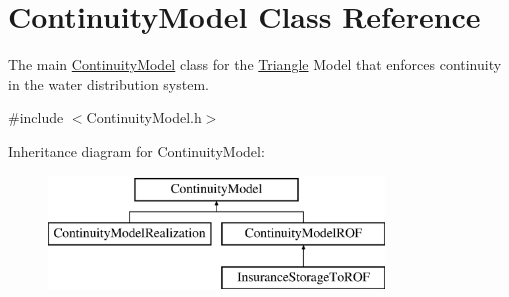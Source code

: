 \hypertarget{classContinuityModel}{}\section{Continuity\+Model Class Reference}
\label{classContinuityModel}


The main {\ttfamily \mbox{\hyperlink{classContinuityModel}{Continuity\+Model}}} class for the \mbox{\hyperlink{classTriangle}{Triangle}} Model that enforces continuity in the water distribution system.  




{\ttfamily \#include $<$Continuity\+Model.\+h$>$}

Inheritance diagram for Continuity\+Model\+:\begin{figure}[H]
\begin{center}
\leavevmode
\includegraphics[height=3.000000cm]{classContinuityModel}
\end{center}
\end{figure}
